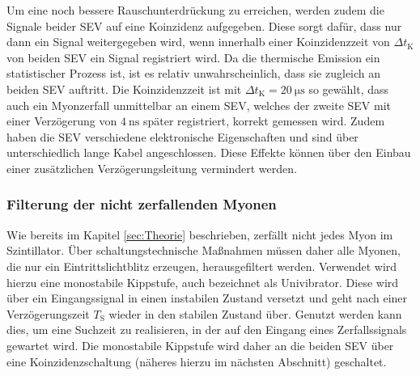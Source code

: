 Um eine noch bessere Rauschunterdrückung zu erreichen, werden zudem die Signale beider SEV auf eine Koinzidenz aufgegeben.
Diese sorgt dafür, dass nur dann ein Signal weitergegeben wird, wenn innerhalb einer Koinzidenzzeit von $\Delta t_{\mathrm{K}}$ von beiden SEV ein Signal registriert wird.
Da die thermische Emission ein statistischer Prozess ist, ist es relativ unwahrscheinlich, dass sie zugleich an beiden SEV auftritt. Die Koinzidenzzeit ist mit $\Delta t_{\mathrm{K}}=\SI{20}{\micro\second}$ so gewählt, dass auch ein Myonzerfall unmittelbar an einem SEV, welches der zweite SEV mit einer Verzögerung von $\SI{4}{\nano\second}$ später registriert, korrekt gemessen wird. Zudem haben die SEV verschiedene elektronische Eigenschaften und sind über unterschiedlich lange Kabel angeschlossen.
Diese Effekte können über den Einbau einer zusätzlichen Verzögerungsleitung vermindert werden.

\subsubsection{Filterung der nicht zerfallenden Myonen}
Wie bereits im Kapitel \ref{sec:Theorie} beschrieben, zerfällt nicht jedes Myon im Szintillator. Über schaltungstechnische Maßnahmen müssen daher alle Myonen, die nur ein Eintrittslichtblitz erzeugen, herausgefiltert werden.
Verwendet wird hierzu eine monostabile Kippstufe, auch bezeichnet als Univibrator. Diese wird über ein Eingangssignal in einen instabilen Zustand versetzt und geht nach einer Verzögerungszeit $T_{\mathrm{S}}$ wieder in den stabilen Zustand über.
Genutzt werden kann dies, um eine Suchzeit zu realisieren, in der auf den Eingang eines Zerfallssignals gewartet wird.
Die monostabile Kippstufe wird daher an die beiden SEV über eine Koinzidenzschaltung (näheres hierzu im nächsten Abschnitt) geschaltet.

